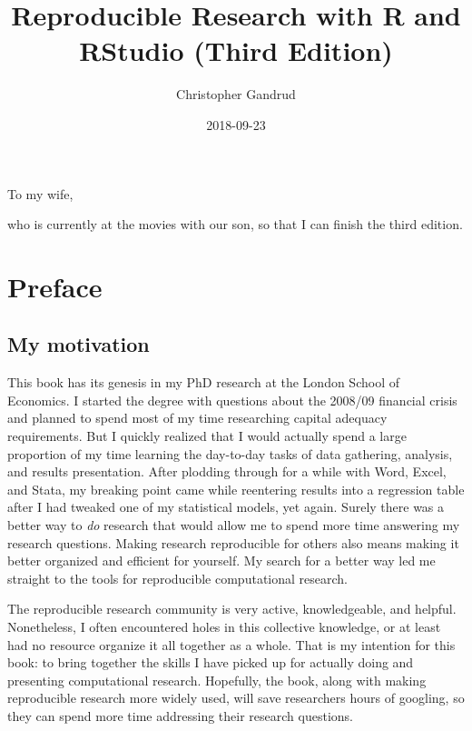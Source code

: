 \documentclass[]{krantz}
\title{Reproducible Research with R and RStudio (Third Edition)}
\author{Christopher Gandrud}
\date{2018-09-23}
\theoremstyle{definition}
\theoremstyle{definition}
\theoremstyle{definition}
\theoremstyle{remark}
\begin{document}
\maketitle


\thispagestyle{empty}

\begin{center}
To my wife,

who is currently at the movies with our son, so that I can finish the third edition.
\end{center}

\setlength{\abovedisplayskip}{-5pt}
\setlength{\abovedisplayshortskip}{-5pt}

{
\hypersetup{linkcolor=}
\setcounter{tocdepth}{2}
\tableofcontents
}
\listoftables
\listoffigures
\hypertarget{preface}{%
\chapter*{Preface}\label{preface}}


\hypertarget{my-motivation}{%
\section*{My motivation}\label{my-motivation}}


This book has its genesis in my PhD research at the London School of
Economics. I started the degree with questions about the 2008/09
financial crisis and planned to spend most of my time researching
capital adequacy requirements. But I quickly realized that I would
actually spend a large proportion of my time learning the day-to-day
tasks of data gathering, analysis, and results presentation. After
plodding through for a while with Word, Excel, and Stata, my breaking
point came while reentering results into a regression table after I had
tweaked one of my statistical models, yet again. Surely there was a
better way to \emph{do} research that would allow me to spend more time
answering my research questions. Making research reproducible for others
also means making it better organized and efficient for yourself. My
search for a better way led me straight to the tools for reproducible
computational research.

The reproducible research community is very active, knowledgeable, and
helpful. Nonetheless, I often encountered holes in this collective
knowledge, or at least had no resource organize it all together as a
whole. That is my intention for this book: to bring together the skills
I have picked up for actually doing and presenting computational
research. Hopefully, the book, along with making reproducible research
more widely used, will save researchers hours of googling, so they can
spend more time addressing their research questions.
\end{document}
